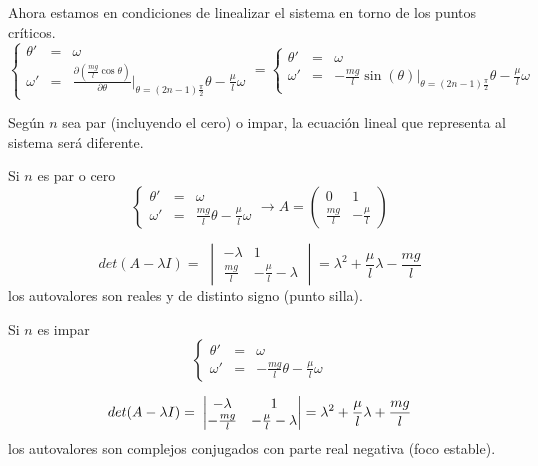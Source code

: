 Ahora estamos en condiciones de linealizar el sistema en torno de los puntos críticos.
% 
\begin{equation}
\left \{
\begin{array}{rcl}
\theta' &=& \omega\\
\omega' &=& \frac{\partial \left(\frac{mg}{l}\cos{\theta}\right)}{\partial\theta}\Big|_{\theta = (2n-1)\frac{\pi}{2}}\theta-\frac{\mu}{l}\omega
\end{array}
\right.
=
\left \{
\begin{array}{rcl}
\theta' &=& \omega\\
\omega' &=& -\frac{mg}{l}\sin(\theta)\Big|_{\theta = (2n-1)\frac{\pi}{2}}\theta-\frac{\mu}{l}\omega
\end{array}
\right.
\nonumber
\end{equation}

Según $n$ sea par (incluyendo el cero) o impar, la ecuación lineal que representa al sistema será diferente.

Si $n$ es par o cero
%
\begin{equation}
\left \{
\begin{array}{rcl}
\theta' &=& \omega\\
\omega' &=& \frac{mg}{l}\theta-\frac{\mu}{l}\omega
\end{array}
\right.
\longrightarrow
A=
\begin{pmatrix}
0 &1 \\
\frac{mg}{l} &-\frac{\mu}{l}
\end{pmatrix}
\nonumber
\end{equation}

\begin{equation}
det(A-\lambda I)= \;
\begin{vmatrix}
-\lambda &1 \\
\frac{mg}{l} &-\frac{\mu}{l}-\lambda
\end{vmatrix}
\nonumber
=\lambda^2+\frac{\mu}{l}\lambda-\frac{mg}{l}
\nonumber
\end{equation}
los autovalores son reales y de distinto signo (punto silla).

Si $n$ es impar
\begin{equation}
\left \{
\begin{array}{rcl}
\theta' &=& \omega\\
\omega' &=& -\frac{mg}{l}\theta-\frac{\mu}{l}\omega
\end{array}
\right. \nonumber
\end{equation}

\begin{equation}
det(A-\lambda I)= \;
\begin{vmatrix}
-\lambda &1 \\
-\frac{mg}{l} &-\frac{\mu}{l}-\lambda
\end{vmatrix}
\nonumber
=\lambda^2+\frac{\mu}{l}\lambda+\frac{mg}{l}\\
\nonumber
\end{equation}
los autovalores son complejos conjugados con parte real negativa (foco estable).

